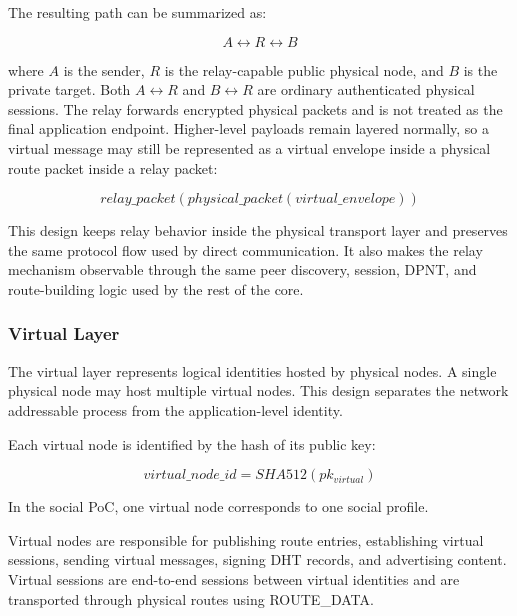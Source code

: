 \documentclass[12pt,a4paper]{article}
\newcommand{\codebreak}[1]{{\footnotesize\ttfamily #1}}
\begin{document}
The resulting path can be summarized as:

\begin{equation}
    A \leftrightarrow R \leftrightarrow B
\end{equation}

where \(A\) is the sender, \(R\) is the relay-capable public physical node, and \(B\) is the private target. Both \(A \leftrightarrow R\) and \(B \leftrightarrow R\) are ordinary authenticated physical sessions. The relay forwards encrypted physical packets and is not treated as the final application endpoint. Higher-level payloads remain layered normally, so a virtual message may still be represented as a virtual envelope inside a physical route packet inside a relay packet:

\begin{equation}
    relay\_packet(physical\_packet(virtual\_envelope))
\end{equation}

This design keeps relay behavior inside the physical transport layer and preserves the same protocol flow used by direct communication. It also makes the relay mechanism observable through the same peer discovery, session, DPNT, and route-building logic used by the rest of the core.

\subsubsection{Virtual Layer}
\label{subsec:virtual-layer-implementation}

The virtual layer represents logical identities hosted by physical nodes. A single physical node may host multiple virtual nodes. This design separates the network addressable process from the application-level identity.

Each virtual node is identified by the hash of its public key:

\begin{equation}
    virtual\_node\_id = SHA512(pk_{virtual})
\end{equation}

In the social PoC, one virtual node corresponds to one social profile.

Virtual nodes are responsible for publishing route entries, establishing virtual sessions, sending virtual messages, signing DHT records, and advertising content. Virtual sessions are end-to-end sessions between virtual identities and are transported through physical routes using \codebreak{ROUTE\_\allowbreak{}DATA}.
\end{document}
